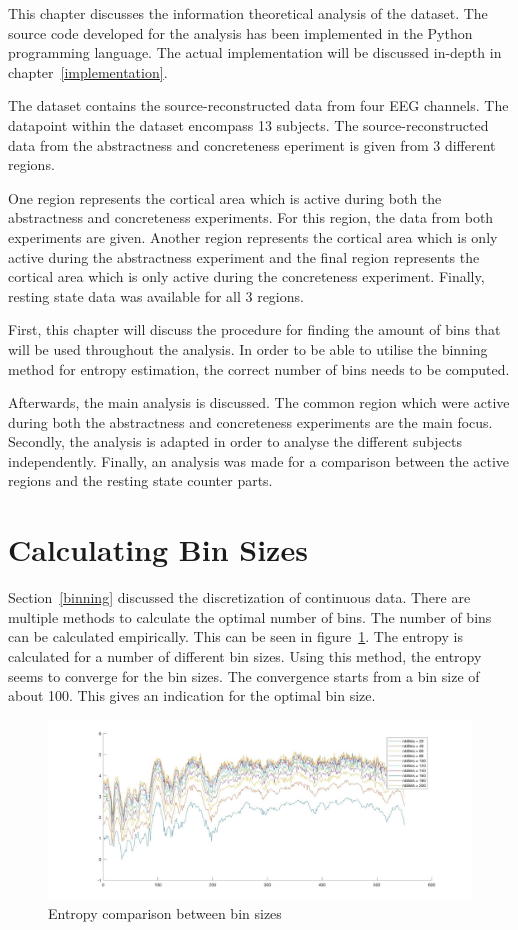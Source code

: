 This chapter discusses the information theoretical analysis of the dataset. The source code developed for the analysis has been implemented in the Python programming language. The actual implementation will be discussed in-depth in chapter~\ref{implementation}. 

The dataset contains the source-reconstructed data from four EEG channels. The datapoint within the dataset encompass 13 subjects. The source-reconstructed data from the abstractness and concreteness eperiment is given from 3 different regions. 

One region represents the cortical area which is active during both the abstractness and concreteness experiments. For this region, the data from both experiments are given. Another region represents the cortical area which is only active during the abstractness experiment and the final region represents the cortical area which is only active during the concreteness experiment. Finally, resting state data was available for all 3 regions.

First, this chapter will discuss the procedure for finding the amount of bins that will be used throughout the analysis. In order to be able to utilise the binning method for entropy estimation, the correct number of bins needs to be computed.

Afterwards, the main analysis is discussed. The common region which were active during both the abstractness and concreteness experiments are the main focus. Secondly, the analysis is adapted in order to analyse the different subjects  independently. Finally, an analysis was made for a comparison between the active regions and the resting state counter parts.

\section{Calculating Bin Sizes}

Section~\ref{binning} discussed the discretization of continuous data. There are multiple methods to calculate the optimal number of bins. The number of bins can be calculated empirically. This can be seen in figure~\ref{bins}. The entropy is calculated for a number of different bin sizes. Using this method, the entropy seems to converge for the bin sizes. The convergence starts from a bin size of about 100. This gives an indication for the optimal bin size.

\begin{figure}[!htb]
\caption{Entropy comparison between bin sizes}
\label{bins}
    \centering
    \includegraphics[width=1.2\textwidth]{fig/bins}
\end{figure}

